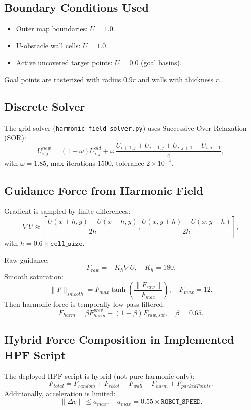 \documentclass[11pt,a4paper]{article}
\begin{document}
\subsection{Boundary Conditions Used}
\begin{itemize}[leftmargin=1.2em]
    \item Outer map boundaries: $U=1.0$.
    \item U-obstacle wall cells: $U=1.0$.
    \item Active uncovered target points: $U=0.0$ (goal basins).
\end{itemize}
Goal points are rasterized with radius $0.9r$ and walls with thickness $r$.

\subsection{Discrete Solver}
The grid solver (\texttt{harmonic\_field\_solver.py}) uses Successive Over-Relaxation (SOR):
\begin{equation}
    U^{new}_{i,j}=(1-\omega)U^{old}_{i,j} + \omega\,\frac{U_{i+1,j}+U_{i-1,j}+U_{i,j+1}+U_{i,j-1}}{4},
\end{equation}
with $\omega=1.85$, max iterations 1500, tolerance $2\times10^{-4}$.

\subsection{Guidance Force from Harmonic Field}
Gradient is sampled by finite differences:
\begin{equation}
    \nabla U \approx \left[\frac{U(x+h,y)-U(x-h,y)}{2h},\frac{U(x,y+h)-U(x,y-h)}{2h}\right],
\end{equation}
with $h=0.6\times\texttt{cell\_size}$.

Raw guidance:
\begin{equation}
    F_{raw}=-K_h\nabla U,\quad K_h=180.
\end{equation}
Smooth saturation:
\begin{equation}
    \|F\|_{smooth}=F_{max}\tanh\left(\frac{\|F_{raw}\|}{F_{max}}\right),\quad F_{max}=12.
\end{equation}
Then harmonic force is temporally low-pass filtered:
\begin{equation}
    F_{harm}=\beta F_{harm}^{prev}+(1-\beta)F_{raw,sat},\quad \beta=0.65.
\end{equation}

\subsection{Hybrid Force Composition in Implemented HPF Script}
The deployed HPF script is hybrid (not pure harmonic-only):
\begin{equation}
    F_{total}=F_{random}+F_{robot}+F_{wall}+F_{harm}+F_{parkedPoints}.
\end{equation}
Additionally, acceleration is limited:
\begin{equation}
    \|\Delta v\|\le a_{max},\quad a_{max}=0.55\times\texttt{ROBOT\_SPEED}.
\end{equation}
\end{document}
